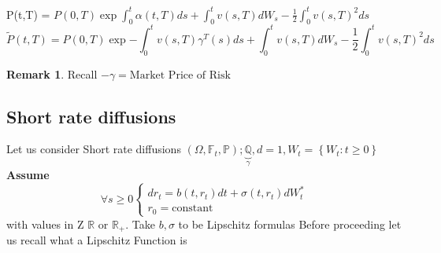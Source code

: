 \documentclass[10pt, oneside, reqno]{amsbook}
\theoremstyle{plain}%
\theoremstyle{definition}
\theoremstyle{rem}
\newtheorem*{rem}{Remark}
\theoremstyle{definition}
\def\Pbb{\ensuremath{\mathbb{P}}}
\def\Qbb{\ensuremath{\mathbb{Q}}}
\def\Rbb{\ensuremath{\mathbb{R}}}
\newcommand{\F}{\mathbb{F}}
\numberwithin{equation}{chapter}
\begin{document}
P(t,T) = $P(0,T)\exp{\int_{0}^{t} \alpha(t,T)ds + \int_0^t v(s,T) dW_s -\frac{1}{2} \int_0^t v(s,T)^{2}ds}$
$$\tilde{P}(t,T) = P(0,T) \exp{-\int_0^t v(s,T)}\gamma^{T}(s)ds + \int_0^t v(s,T) dW_s - \frac{1}{2} \int_0
^t v(s,T)^{2} ds$$
\begin{rem}
 Recall $-\gamma= \text{Market Price of Risk}$
\end{rem}
\subsection{Short rate diffusions}
Let us consider Short rate diffusions 
$(\Omega, \F_t, \Pbb); \underbrace{\Qbb}_{\gamma}, d=1, W_t = \left\lbrace W_t: t \geq 0\right\rbrace$
\textbf{Assume} \begin{equation}\label{dagger}
                 \forall s \geq 0 
\begin{cases} dr_{t}=b(t,r_{t})dt + \sigma(t,r_{t})dW^{*}_{t}  \\ 
r_{0} = \text{constant}
\end{cases} 
                \end{equation}
with values in Z $\Rbb$ or $\Rbb_{+}$.
Take $b, \sigma$ to be Lipschitz formulas
Before proceeding let us recall what a Lipschitz Function is
\end{document}
